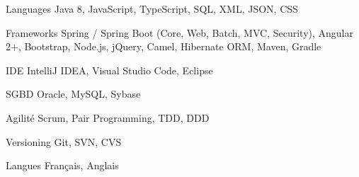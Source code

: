 \begin{cvskills}

  \cvskill
    {Languages} %
    {Java 8, JavaScript, TypeScript, SQL, XML, JSON, CSS} %

  \cvskill
    {Frameworks} %
    {Spring / Spring Boot (Core, Web, Batch, MVC, Security), Angular 2+, Bootstrap, Node.js, jQuery, Camel, Hibernate ORM, Maven, Gradle} %
    
  \cvskill
    {IDE} %
    {IntelliJ IDEA, Visual Studio Code, Eclipse} %
    
  \cvskill
    {SGBD} %
    {Oracle, MySQL, Sybase} %
    
  \cvskill
    {Agilité} %
    {Scrum, Pair Programming, TDD, DDD} %
       
  \cvskill
    {Versioning} %
    {Git, SVN, CVS} %
    
  \cvskill
    {Langues} %
    {Français, Anglais} %


\end{cvskills}